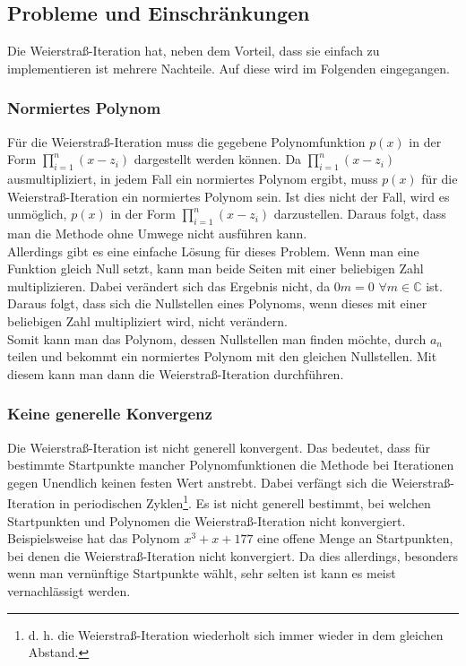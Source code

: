 \documentclass[12pt]{article}
\begin{document}
\subsection{Probleme und Einschränkungen}
Die Weierstraß-Iteration hat, neben dem Vorteil, dass sie einfach zu implementieren ist mehrere Nachteile. Auf diese wird im Folgenden eingegangen.
\subsubsection{Normiertes Polynom}
Für die Weierstraß-Iteration muss die gegebene Polynomfunktion $p(x)$ in der Form $\prod_{i=1}^n (x-z_i)$ dargestellt werden können. Da $\prod_{i=1}^n (x-z_i)$ ausmultipliziert, in jedem Fall ein normiertes Polynom ergibt, muss $p(x)$ für die Weierstraß-Iteration ein normiertes Polynom sein.
Ist dies nicht der Fall, wird es unmöglich, $p(x)$ in der Form $\prod_{i=1}^n (x-z_i)$ darzustellen. Daraus folgt, dass man die Methode ohne Umwege nicht ausführen kann. \\
Allerdings gibt es eine einfache Lösung für dieses Problem. Wenn man eine Funktion gleich Null setzt, kann man beide Seiten mit einer beliebigen Zahl multiplizieren. Dabei verändert sich das Ergebnis nicht, da $0m = 0$ \space $\forall m \in \mathbb{C}$ ist. Daraus folgt, dass sich die Nullstellen eines Polynoms, wenn dieses mit einer beliebigen Zahl multipliziert wird, nicht verändern. \\
Somit kann man das Polynom, dessen Nullstellen man finden möchte, durch $a_n$ teilen und bekommt ein normiertes Polynom mit den gleichen Nullstellen. Mit diesem kann man dann die Weierstraß-Iteration durchführen.

\subsubsection{Keine generelle Konvergenz}
Die Weierstraß-Iteration ist nicht generell konvergent. Das bedeutet, dass für bestimmte Startpunkte mancher Polynomfunktionen die Methode bei Iterationen gegen Unendlich keinen festen Wert anstrebt. Dabei verfängt sich die Weierstraß-Iteration in periodischen Zyklen\footnote{d. h. die Weierstraß-Iteration wiederholt sich immer wieder in dem gleichen Abstand.}. Es ist nicht generell bestimmt, bei welchen Startpunkten und Polynomen die Weierstraß-Iteration nicht konvergiert. Beispielsweise hat das Polynom $x^3+x+177$ eine offene Menge an Startpunkten, bei denen die Weierstraß-Iteration nicht konvergiert. Da dies allerdings, besonders wenn man vernünftige Startpunkte wählt, sehr selten ist kann es meist vernachlässigt werden. 
\end{document}
